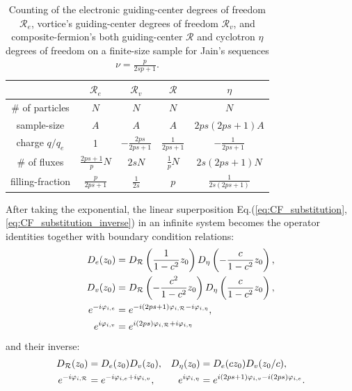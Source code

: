 \begin{table}
    \centering
    \begin{tabular}{||c | c | c | c | c||}
        \hline
                         & $\mathcal R_e$      & $\mathcal R_v$       & $\mathcal R$      & $\eta$                \\
        \hline\hline
        \# of particles  & $N$                 & $N$                  & $N$               & $N$                   \\ \hline
        sample-size      & $A$                 & $A$                  & $A$               & $2ps(2ps+1) A$        \\\hline
        charge $q/q_e$   & 1                   & $-\frac{2ps}{2ps+1}$ & $\frac{1}{2ps+1}$ & $-\frac{1}{2ps+1}$    \\ \hline
        \# of fluxes     & $\frac{2ps+1}{p} N$ & $2s N$               & $\frac{1}{p} N $  & $2s(2ps+1) N$         \\ \hline
        filling-fraction & $\frac{p}{2ps+1}$   & $\frac{1}{2s}$       & $p$               & $\frac{1}{2s(2ps+1)}$ \\ \hline
        \hline
    \end{tabular}
    \caption{Counting of the electronic guiding-center degrees of freedom $\mathcal R_e$, vortice's guiding-center degrees of freedom $\mathcal R_v$, and composite-fermion's both guiding-center $\mathcal R$ and cyclotron $\eta$ degrees of freedom on a finite-size sample for Jain's sequences $\nu=\frac{p}{2sp+1}$.}
    \label{tb:dimensions}
\end{table}

After taking the exponential, the linear superposition Eq.(\ref{eq:CF_substitution},\ref{eq:CF_substitution_inverse}) in an infinite system becomes the operator identities together with boundary condition relations:
\begin{align}
    D_e(z_0)            & =D_{\mathcal R}\left(\frac{1}{1-c^2}z_0\right) D_{\eta}\left(-\frac{c}{1-c^2}z_0\right),\notag   \\
    D_v(z_0)            & =D_{\mathcal R}\left(-\frac{c^2}{1-c^2}z_0\right) D_{\eta}\left(\frac{c}{1-c^2}z_0\right),\notag \\
    e^{-i\varphi_{i,e}} & =e^{-i(2ps+1)\varphi_{i,\mathcal R}-i\varphi_{i,\eta}},\notag                                    \\ e^{i\varphi_{i,v}}&=e^{i(2ps)\varphi_{i,\mathcal R}+i\varphi_{i,\eta}}\label{eq:D_e_D_v_to_D_R_D_eta}
\end{align}
and their inverse:
\begin{align}
    D_{\mathcal R}(z_0)          & =D_e(z_0)D_v(z_0),                   & D_{\eta}(z_0)         & =D_e(cz_0)D_v(z_0/c),\notag                                                    \\
    e^{-i\varphi_{i,\mathcal R}} & =e^{-i\varphi_{i,e}+i\varphi_{i,v}}, & e^{i\varphi_{i,\eta}} & =e^{i(2ps+1)\varphi_{i,v}-i(2ps)\varphi_{i,e}}.\label{eq:D_R_D_eta_to_D_e_D_v}
\end{align}


